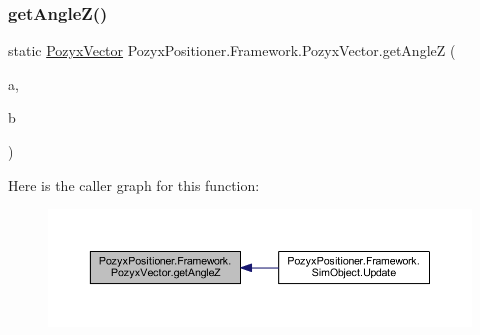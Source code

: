 \mbox{\label{struct_pozyx_positioner_1_1_framework_1_1_pozyx_vector_a1ba057e7ddbad697e8a8ed6322f8fe7f}} 
\subsubsection{\texorpdfstring{get\+Angle\+Z()}{getAngleZ()}}
{\footnotesize\ttfamily static \hyperlink{struct_pozyx_positioner_1_1_framework_1_1_pozyx_vector}{Pozyx\+Vector} Pozyx\+Positioner.\+Framework.\+Pozyx\+Vector.\+get\+AngleZ (\begin{DoxyParamCaption}\item[{\hyperlink{struct_pozyx_positioner_1_1_framework_1_1_pozyx_vector}{Pozyx\+Vector}}]{a,  }\item[{\hyperlink{struct_pozyx_positioner_1_1_framework_1_1_pozyx_vector}{Pozyx\+Vector}}]{b }\end{DoxyParamCaption})\hspace{0.3cm}{\ttfamily [static]}}

Here is the caller graph for this function\+:
\nopagebreak
\begin{figure}[H]
\begin{center}
\leavevmode
\includegraphics[width=350pt]{struct_pozyx_positioner_1_1_framework_1_1_pozyx_vector_a1ba057e7ddbad697e8a8ed6322f8fe7f_icgraph}
\end{center}
\end{figure}
\mbox{\label{struct_pozyx_positioner_1_1_framework_1_1_pozyx_vector_a1dbaa4407ca3196f8b4de2d86e5ce395}} 
